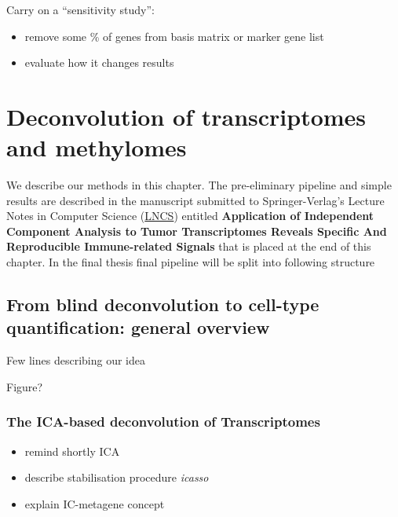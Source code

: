 \documentclass[12pt,]{book}
\providecommand{\tightlist}{%
  \setlength{\itemsep}{0pt}\setlength{\parskip}{0pt}}
\theoremstyle{definition}
\theoremstyle{definition}
\theoremstyle{definition}
\theoremstyle{remark}
\begin{document}
Carry on a ``sensitivity study'':

\begin{itemize}
\tightlist
\item
  remove some \% of genes from basis matrix or marker gene list
\item
  evaluate how it changes results
\end{itemize}

\hypertarget{deconvolution-of-transcriptomes-and-methylomes}{%
\chapter{Deconvolution of transcriptomes and
methylomes}\label{deconvolution-of-transcriptomes-and-methylomes}}

We describe our methods in this chapter. The pre-eliminary pipeline and
simple results are described in the manuscript submitted to
Springer-Verlag's Lecture Notes in Computer Science
(\href{http://www.springer.com/gb/computer-science/lncs}{LNCS}) entitled
\textbf{Application of Independent Component Analysis to Tumor
Transcriptomes Reveals Specific And Reproducible Immune-related Signals}
that is placed at the end of this chapter. In the final thesis final
pipeline will be split into following structure

\hypertarget{from-blind-deconvolution-to-cell-type-quantification-general-overview}{%
\section{From blind deconvolution to cell-type quantification: general
overview}\label{from-blind-deconvolution-to-cell-type-quantification-general-overview}}

Few lines describing our idea

Figure?

\hypertarget{the-ica-based-deconvolution-of-transcriptomes}{%
\subsection{The ICA-based deconvolution of
Transcriptomes}\label{the-ica-based-deconvolution-of-transcriptomes}}

\begin{itemize}
\tightlist
\item
  remind shortly ICA
\item
  describe stabilisation procedure \emph{icasso}
\item
  explain IC-metagene concept
\end{itemize}
\end{document}
